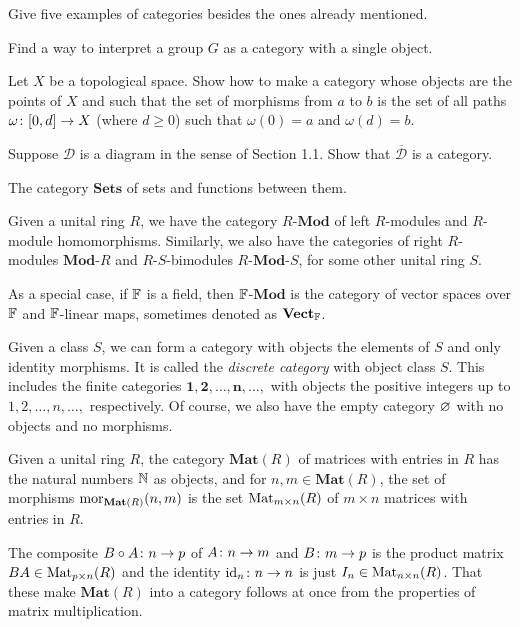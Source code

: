 \bx
\ben[label=(\alph*)]
\item Give five examples of categories besides the ones already mentioned.
\item Find a way to interpret a group $G$ as a category with a single object.
\item Let $X$ be a topological space. Show how to make a category whose objects are the points of $X$ and such that the set of morphisms from $a$ to $b$ is the set of all paths $\omega \colon [0, d] \to X$ (where $d \geq 0$) such that $\omega(0) = a$ and $\omega(d) = b$.
\item Suppose $\mathcal{D}$ is a diagram in the sense of Section 1.1. Show that $\overline{\mathcal{D}}$ is a category.
\een
\ex

\bs
\ben[label=(\alph*)]
\item 
\ben[label=(\roman*)]
\item The category $\mathbf{Sets}$ of sets and functions between them.
\item Given a unital ring $R$, we have the category $R$-$\mathbf{Mod}$ of left $R$-modules and $R$-module homomorphisms. Similarly, we also have the categories of right $R$-modules $\mathbf{Mod}$-$R$ and $R$-$S$-bimodules $R$-$\mathbf{Mod}$-$S$, for some other unital ring $S$.

As a special case, if $\mathbb{F}$ is a field, then $\mathbb{F}$-$\mathbf{Mod}$ is the category of vector spaces over $\mathbb{F}$ and $\mathbb{F}$-linear maps, sometimes denoted as $\mathbf{Vect}_{\mathbb{F}}$. 
\item Given a class $S$, we can form a category with objects the elements of $S$ and only identity morphisms. It is called the \emph{discrete category} with object class $S$. This includes the finite categories $\mathbf{1}, \mathbf{2},\ldots, \mathbf{n},\ldots,$ with objects the positive integers up to $1,2,\ldots,n,\ldots,$ respectively. Of course, we also have the empty category $\varnothing$ with no objects and no morphisms.  
\item Given a unital ring $R$, the category $\mathbf{Mat}(R)$ of matrices with entries in $R$ has the natural numbers $\mathbb{N}$ as objects, and for $n,m\in \mathbf{Mat}(R)$, the set of morphisms $\operatorname{mor}_{\mathbf{Mat}(R)}(n,m)$ is the set $\mathrm{Mat}_{m\times n}(R)$ of $m\times n$ matrices with entries in $R$.

The composite $B\circ A\colon n\to p$ of $A\colon n\to m$ and $B\colon m\to p$ is the product matrix $BA\in\mathrm{Mat}_{p\times n}(R)$ and the identity $\mathrm{id}_n\colon n\to n$ is just $I_n\in \mathrm{Mat}_{n\times n}(R)$. That these make $\mathbf{Mat}(R)$ into a category follows at once from the properties of matrix multiplication.

